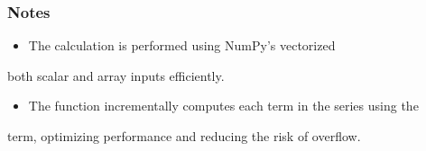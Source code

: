 \documentclass[a4paper,10pt,oneside,english]{sphinxmanual}
\begin{document}
\begin{fulllineitems}
\begin{sphinxVerbatim}[commandchars=\\\{\}]
\end{sphinxVerbatim}

\begin{sphinxVerbatim}[commandchars=\\\{\}]
\end{sphinxVerbatim}

\begin{sphinxVerbatim}[commandchars=\\\{\}]
\PYG{p}{[}  \PYG{p}{]}
\end{sphinxVerbatim}
\subsubsection*{Notes}
\begin{itemize}
\item {} 
\sphinxAtStartPar
The calculation is performed using NumPy’s vectorized

\end{itemize}
\begin{description}
\sphinxAtStartPar
both scalar and array inputs efficiently.

\end{description}
\begin{itemize}
\item {} 
\sphinxAtStartPar
The function incrementally computes each term in the series using the

\end{itemize}
\begin{description}
\sphinxAtStartPar
term, optimizing performance and reducing the risk of overflow.

\end{description}

\end{fulllineitems}

\end{document}
